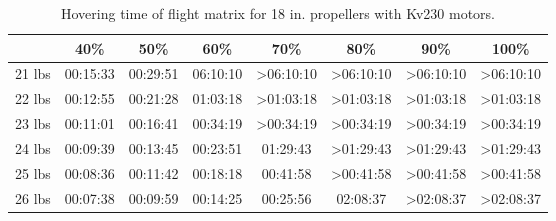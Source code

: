 \documentclass{article}
\begin{document}
\begin{table}[h]
    \centering
    \begin{tabular}{|c|c|c|c|c|c|c|c|}
        \hline
 & 40\% & 50\% & 60\% & 70\% & 80\% & 90\% & 100\%  \\
        \hline
        21 lbs & \cellcolor{red!80} 00:15:33 & \cellcolor{red!80} 00:29:51 & \cellcolor{red!80} 06:10:10 & \cellcolor{ForestGreen!80} >06:10:10 & \cellcolor{ForestGreen!80} >06:10:10 & \cellcolor{ForestGreen!80} >06:10:10 & \cellcolor{ForestGreen!80} >06:10:10 \\
        \hline
        22 lbs & \cellcolor{red!80} 00:12:55 & \cellcolor{red!80} 00:21:28 & \cellcolor{red!80} 01:03:18 & \cellcolor{ForestGreen!80} >01:03:18 & \cellcolor{ForestGreen!80} >01:03:18 & \cellcolor{ForestGreen!80} >01:03:18 & \cellcolor{ForestGreen!80} >01:03:18 \\
        \hline
        23 lbs & \cellcolor{red!80} 00:11:01 & \cellcolor{red!80} 00:16:41 & \cellcolor{red!80} 00:34:19 & \cellcolor{ForestGreen!80} >00:34:19 & \cellcolor{ForestGreen!80} >00:34:19 & \cellcolor{ForestGreen!80} >00:34:19 & \cellcolor{ForestGreen!80} >00:34:19 \\
        \hline
        24 lbs & \cellcolor{red!80} 00:09:39 & \cellcolor{red!80} 00:13:45 & \cellcolor{red!80} 00:23:51 & \cellcolor{red!80} 01:29:43 & \cellcolor{ForestGreen!80} >01:29:43 & \cellcolor{ForestGreen!80} >01:29:43 & \cellcolor{ForestGreen!80} >01:29:43 \\
        \hline
        25 lbs & \cellcolor{red!80} 00:08:36 & \cellcolor{red!80} 00:11:42 & \cellcolor{red!80} 00:18:18 & \cellcolor{red!80} 00:41:58 & \cellcolor{ForestGreen!80} >00:41:58 & \cellcolor{ForestGreen!80} >00:41:58 & \cellcolor{ForestGreen!80} >00:41:58 \\
        \hline
        26 lbs & \cellcolor{red!80} 00:07:38 & \cellcolor{red!80} 00:09:59 & \cellcolor{red!80} 00:14:25 & \cellcolor{red!80} 00:25:56 & \cellcolor{red!80} 02:08:37 & \cellcolor{ForestGreen!80} >02:08:37 & \cellcolor{ForestGreen!80} >02:08:37 \\
        \hline
    \end{tabular}
    \caption{Hovering time of flight matrix for 18 in. propellers with Kv230 motors.}
    \label{tab:hover_ToF_matrix_18}
\end{table}
\end{document}
